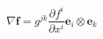 \documentclass[a4paper]{article}
\begin{document}
\pagestyle{empty}
$
\nabla \boldsymbol{f} = g^{jk}\dfrac{\partial f^{i}}{\partial x^i} \boldsymbol{e}_i \otimes \boldsymbol{e}_k
$
\end{document}
